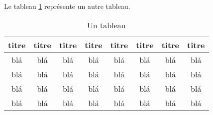 Le tableau \ref{chap3:tableau1} représente un autre tableau.

\begin{table}
    \parbox{0.65\textwidth}{%
    \caption{Un tableau}%
    \label{chap3:tableau1}} %
    \begin{tabular}{|c|c|c|c|c|c|c|c|}
	\hline
		      {\bf titre} & {\bf titre} & {\bf titre} & {\bf titre} & {\bf titre} & {\bf titre} & {\bf titre} & {\bf titre} \\
	  \hline
			blá & blá & blá & blá & blá & blá & blá & blá \\
	  \hline
			blá & blá & blá & blá & blá & blá & blá & blá \\
	  \hline
			blá & blá & blá & blá & blá & blá & blá & blá \\
	  \hline
			blá & blá & blá & blá & blá & blá & blá & blá \\
	  \hline
    \end{tabular}
\end{table}
